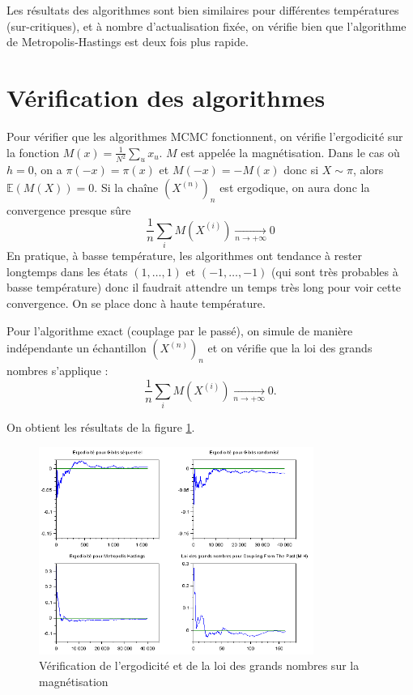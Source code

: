 \documentclass[a4paper,11pt]{article}
\begin{document}
Les résultats des algorithmes sont bien similaires pour différentes températures (sur-critiques), et à nombre d'actualisation fixée, on vérifie bien que l'algorithme de Metropolis-Hastings est deux fois plus rapide.

\section{Vérification des algorithmes}\label{sec:check}

Pour vérifier que les algorithmes MCMC fonctionnent, on vérifie l'ergodicité sur la fonction $M(x) = \frac{1}{N^2} \sum_u x_u$. $M$ est appelée la magnétisation. Dans le cas où $h = 0$, on a $\pi(-x) = \pi(x)$ et $M(-x) = -M(x)$ donc si $X \sim \pi$, alors $\mathbb E(M(X)) = 0$. Si la chaîne $(X^{(n)})_n$ est ergodique, on aura donc la convergence presque sûre
$$\frac{1}{n} \sum_i M(X^{(i)}) \xrightarrow[n \rightarrow +\infty]{} 0$$
En pratique, à basse température, les algorithmes ont tendance à rester longtemps dans les états $(1,\hdots,1)$ et $(-1,\hdots,-1)$ (qui sont très probables à basse température) donc il faudrait attendre un temps très long pour voir cette convergence. On se place donc à haute température.

Pour l'algorithme exact (couplage par le passé), on simule de manière indépendante un échantillon $(X^{(n)})_n$ et on vérifie que la loi des grands nombres s'applique :
$$\frac{1}{n} \sum_i M(X^{(i)}) \xrightarrow[n \rightarrow +\infty]{} 0.$$

On obtient les résultats de la figure \ref{fig:ergodic}.
\begin{figure}[!htbp]
	\centering
	\includegraphics[width=0.8\textwidth]{ergodicite_magnetisation.png}
	\caption{Vérification de l'ergodicité et de la loi des grands nombres sur la magnétisation}
	\label{fig:ergodic}
\end{figure}
\end{document}
